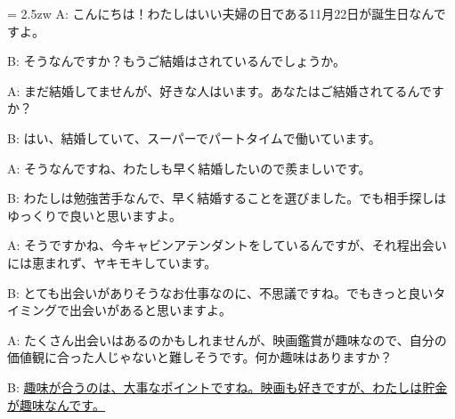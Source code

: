 \documentclass[11pt]{amsart}
\title{}
\author{}
\newenvironment{hangall}[1]{\hangindent = 2.5zw\everypar{\hangindent = 2.5zw}}{}
\begin{document}
\maketitle
\begin{hangall}{}%
A: こんにちは！わたしはいい夫婦の日である11月22日が誕生日なんですよ。

B: そうなんですか？もうご結婚はされているんでしょうか。

A: まだ結婚してませんが、好きな人はいます。あなたはご結婚されてるんですか？

B: はい、結婚していて、スーパーでパートタイムで働いています。

A: そうなんですね、わたしも早く結婚したいので羨ましいです。

B: わたしは勉強苦手なんで、早く結婚することを選びました。でも相手探しはゆっくりで良いと思いますよ。

A: そうですかね、今キャビンアテンダントをしているんですが、それ程出会いには恵まれず、ヤキモキしています。

B: とても出会いがありそうなお仕事なのに、不思議ですね。でもきっと良いタイミングで出会いがあると思いますよ。

A: たくさん出会いはあるのかもしれませんが、映画鑑賞が趣味なので、自分の価値観に合った人じゃないと難しそうです。何か趣味はありますか？

B: \ul{趣味が合うのは、大事なポイントですね。映画も好きですが、わたしは貯金が趣味なんです。}\end{hangall}
\end{document}
